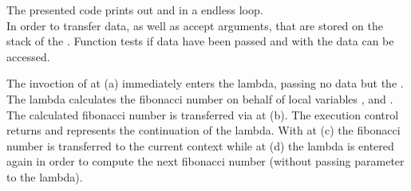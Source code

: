 The presented code prints out  and  in a endless loop.\\

In order to transfer data, \call as well as \resume accept arguments, that are
stored on the stack of the \currcont. Function \davail tests if data have been
passed and with \dtransfer the data can be accessed.


The invoction of \call at (a) immediately enters the lambda, passing no data
but the \currcont. The lambda calculates the fibonacci number on behalf of local
variables ,  and . The calculated fibonacci number is
transferred via \resume at (b). The execution control returns and 
represents the continuation of the lambda. With \dtransfer at (c) the fibonacci
number is transferred to the current context while at (d) the lambda is entered
again in order to compute the next fibonacci number (without passing parameter
to the lambda).
